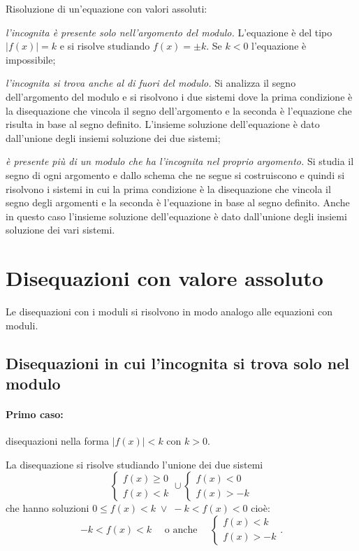 \begin{procedura} {Risoluzione di un'equazione con valori assoluti:}
\begin{enumeratea}
\item \emph{l'incognita è presente solo nell'argomento del modulo.} L'equazione è del tipo $\left|f(x)\right|=k$ e si risolve studiando $f(x)=\pm k$. Se $k<0$ l'equazione è impossibile;
\item \emph{l'incognita si trova anche al di fuori del modulo.} Si analizza il segno dell'argomento del modulo e si risolvono i due sistemi dove la prima condizione è la disequazione che vincola il segno dell'argomento e la seconda è l'equazione che risulta in base al segno definito. L'insieme soluzione dell'equazione è dato dall'unione degli insiemi soluzione dei due sistemi;
\item \emph{è presente più di un modulo che ha l'incognita nel proprio argomento.} Si studia il segno di ogni argomento e dallo schema che ne segue si costruiscono e quindi si risolvono i sistemi in cui la prima condizione è la disequazione che vincola il segno degli argomenti e la seconda è l'equazione in base al segno definito. Anche in questo caso l'insieme soluzione dell'equazione è dato dall'unione degli insiemi soluzione dei vari sistemi.
\end{enumeratea}
\end{procedura}
\ovalbox{\risolvii \ref{ese:7.17}, \ref{ese:7.18}, \ref{ese:7.19}, \ref{ese:7.20}, \ref{ese:7.21}, \ref{ese:7.22}, \ref{ese:7.23}, \ref{ese:7.24}, \ref{ese:7.25}, \ref{ese:7.26}, \ref{ese:7.27}, \ref{ese:7.28}, \ref{ese:7.29}, \ref{ese:7.30}}

\section{Disequazioni con valore assoluto}
Le disequazioni con i moduli si risolvono in modo analogo alle equazioni con moduli.

\subsection{Disequazioni in cui l'incognita si trova solo nel modulo}
\paragraph{Primo caso:} disequazioni nella forma $\left|f(x)\right|<k$ con $ k>0 $.

La disequazione si risolve studiando l'unione dei due sistemi 
\[\left\{\begin{array}{l}{f(x)\ge 0}\\{f(x)<k}\end{array}\right.\cup\left\{\begin{array}{l}{f(x)< 0}\\{f(x)>-k}\end{array}\right.\]
che hanno soluzioni $ 0\le f(x)<k\;\vee\; -k<f(x)<0 $ cioè:
\[-k<f(x)<k\quad \text{ o anche }\quad\left\{\begin{array}{l}{f(x)< k}\\{f(x)>-k}\end{array}\right..\]

